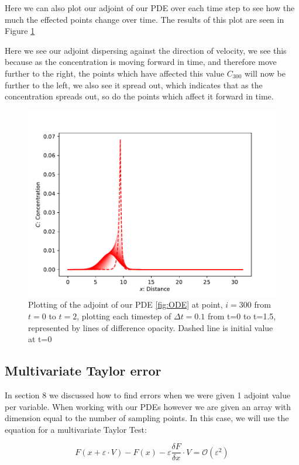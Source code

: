 \documentclass{article}
\begin{document}
Here we can also plot our adjoint of our PDE over each time step to see how the much the effected points change over time. The results of this plot \cite{github} are seen in Figure \ref{fig:adjointplot}

Here we see our adjoint dispersing against the direction of velocity, we see this because as the concentration is moving forward in time, and therefore move further to the right, the points which have affected this value $C_{300}$ will now be further to the left, we also see it spread out, which indicates that as the concentration spreads out, so do the points which affect it forward in time.

\begin{figure}[h!]
    \centering
    \includegraphics[width=12cm]{images/Graph_PDE_adjoint_plot.pdf}
    \caption{Plotting of the adjoint of our PDE \ref{fig:ODE} at point, $i=300$ from $t=0$ to $t=2$, plotting each timestep of $\Delta t=0.1$ from t=0 to t=1.5, represented by lines of difference opacity. Dashed line is initial value at t=0}
    \label{fig:adjointplot}
\end{figure}


\subsection{Multivariate Taylor error}

In section 8 we discussed how to find errors when we were given 1 adjoint value per variable. When working with our PDEs however we are given an array with dimension equal to the number of sampling points. In this case, we will use the equation for a multivariate Taylor Test:

\begin{equation}
    F(x + \varepsilon \cdot V) - F(x) - \varepsilon \frac{\delta F}{\delta x} \cdot V = \mathcal{O}(\varepsilon^2)
    \label{multidimtaylor}
\end{equation}
\end{document}
